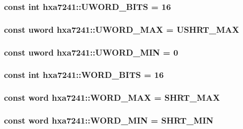\subsubsection{\setlength{\rightskip}{0pt plus 5cm}const int {\bf hxa7241::UWORD\_\-BITS} = 16}\label{namespacehxa7241_3c901e42fc702a526da6502107198d8f}


\subsubsection{\setlength{\rightskip}{0pt plus 5cm}const {\bf uword} {\bf hxa7241::UWORD\_\-MAX} = USHRT\_\-MAX}\label{namespacehxa7241_8affc157ed03316fcd9173cea844e441}


\subsubsection{\setlength{\rightskip}{0pt plus 5cm}const {\bf uword} {\bf hxa7241::UWORD\_\-MIN} = 0}\label{namespacehxa7241_94fcac7abfdda4cce159043b1b920a82}


\subsubsection{\setlength{\rightskip}{0pt plus 5cm}const int {\bf hxa7241::WORD\_\-BITS} = 16}\label{namespacehxa7241_557317dd9eb73c58ce12dd1ebeeb15ad}


\subsubsection{\setlength{\rightskip}{0pt plus 5cm}const {\bf word} {\bf hxa7241::WORD\_\-MAX} = SHRT\_\-MAX}\label{namespacehxa7241_a1c315326fc6eac19ae2b36ebeaf5cf2}


\subsubsection{\setlength{\rightskip}{0pt plus 5cm}const {\bf word} {\bf hxa7241::WORD\_\-MIN} = SHRT\_\-MIN}\label{namespacehxa7241_8f61a80a277aa122a7871f37ecfe74c1}



